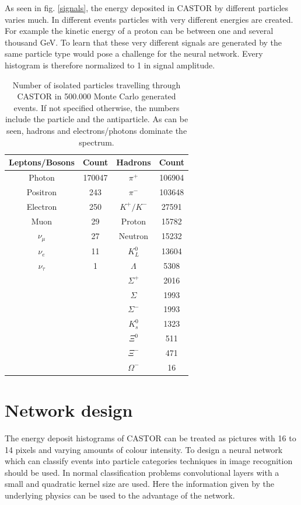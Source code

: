 As seen in fig. \ref{signals}, the energy deposited in CASTOR by different particles varies much. In different events particles with very different energies are created. For example the kinetic energy of a proton can be between one and several thousand GeV. To learn that these very different signals are generated by the same particle type would pose a challenge for the neural network. Every histogram is therefore normalized to 1 in signal amplitude. 
\begin{table}
\centering
\caption{Number of isolated particles travelling through CASTOR in 500.000 Monte Carlo generated events. If not specified otherwise, the numbers include the particle and the antiparticle. As can be seen, hadrons and electrons/photons dominate the spectrum.}
\sffamily
\begin{tabular}{cc |cc }
\hline
Leptons/Bosons & Count & Hadrons & Count \\ \hline
Photon & 170047 & $\pi^+$ & 106904 \\
Positron & 243 & $\pi^-$ & 103648 \\
Electron & 250 & $K^+ / K^-$ & 27591 \\
Muon & 29 & Proton & 15782\\
$\nu_{\mu}$ & 27 & Neutron & 15232 \\
$\nu_e$ & 11 & $K^0_L$ & 13604 \\
$\nu_{\tau}$ & 1 &  $\Lambda$ & 5308\\
& & $\Sigma^+$ & 2016 \\
& & $\Sigma$ & 1993 \\
& & $\Sigma^-$ & 1993 \\
& & $K^0_s$ & 1323 \\
& & $\Xi^0$ & 511 \\
& & $\Xi^-$ & 471 \\
& & $\Omega^-$ & 16 \\
 \hline
\end{tabular}
\label{particlecounts}
\end{table}
\section{Network design}
The energy deposit histograms of CASTOR can be treated as pictures with 16 to 14 pixels and varying amounts of colour intensity. To design a neural network which can classify events into particle categories techniques in image recognition should be used. In normal classification problems convolutional layers with a small and quadratic kernel size are used. Here the information given by the underlying physics can be used to the advantage of the network. 

